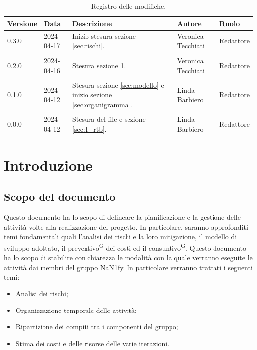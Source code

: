 \documentclass[8pt]{article}
\newcommand{\glossterm}[1]{#1\textsuperscript{G}} %
\begin{document}
\begin{table}[H]
\hypersetup{hidelinks}
	\centering
	\begin{tabular}{p{1.2cm} p{2cm} p{6cm} p{3cm} p{2cm}}
		\toprule
		\textbf{Versione}& \textbf{Data} & \textbf{Descrizione} & \textbf{Autore} & \textbf{Ruolo} \\
		\midrule 
    0.3.0 & 2024-04-17 & Inizio stesura sezione \ref{sec:rischi}. & Veronica Tecchiati & Redattore \\\\
		0.2.0 & 2024-04-16 & Stesura sezione \ref{sec:intro}. & Veronica Tecchiati & Redattore \\\\
		0.1.0 & 2024-04-12 & Stesura sezione \ref{sec:modello} e inizio sezione \ref{sec:organigramma}. & Linda Barbiero & Redattore \\\\
		0.0.0 & 2024-04-12 & Stesura del file e sezione \ref{sec:1_rtb}. & Linda Barbiero & Redattore \\
		\bottomrule
	\end{tabular}
	\caption{Registro delle modifiche.}
	\label{table:Registro delle modifiche}
\end{table}
\newpage
\clearpage
{\hypersetup{hidelinks} \tableofcontents}
\clearpage
\newpage
\newpage
{\hypersetup{hidelinks} \listoffigures}
\newpage
{\hypersetup{hidelinks} \listoftables}
\newpage
\justifying
\section{Introduzione} \label{sec:intro}
\subsection{Scopo del documento}
Questo documento ha lo scopo di delineare la pianificazione e la gestione delle attività volte alla realizzazione del progetto. In particolare, saranno approfonditi temi fondamentali quali l'analisi dei rischi e la loro mitigazione, il modello di sviluppo adottato, il \glossterm{preventivo} dei costi ed il \glossterm{consuntivo}. Questo documento ha lo scopo di stabilire con chiarezza le modalità con la quale verranno eseguite
le attività dai membri del gruppo NaN1fy. In particolare verranno trattati i seguenti temi:
\begin{itemize}
\setlength\itemsep{0em}
    \item Analisi dei rischi;
    \item Organizzazione temporale delle attivit\`{a};
    \item Ripartizione dei compiti tra i componenti del gruppo;
    \item Stima dei costi e delle risorse delle varie iterazioni.
\end{itemize}
\end{document}
